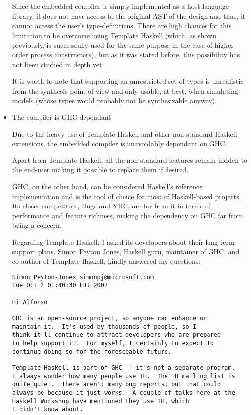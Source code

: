 \documentclass[a4paper,twoside,11pt]{article}
\begin{document}
\begin{itemize}
  Since the embedded compiler is simply implemented as a host language
  library, it does not have access to the original AST of the design and thus,
  it cannot access the user's type-definitions. There are high chances for
  this limitation to be overcome using Template Haskell (which, as shown
  previously, is successfully used for the same purpose in the case of higher
  order process constructors), but as it was stated before, this possibility
  has not been studied in depth yet.

  It is worth to note that supporting an unrestricted set of types is
  unrealistic from the synthesis point of view and only usable, at best, when
  simulating models (whose types would probably not be synthesizable anyway).
  
\item The compiler is GHC-dependant

  Due to the heavy use of Template Haskell and other non-standard Haskell
  extensions, the embedded compiler is unavoidably dependant on GHC.

  Apart from Template Haskell, all the non-standard features remain
  hidden to the end-user making it possible to replace them if desired.
  
  GHC, on the other hand, can be considered Haskell's reference implementation
  and is the tool of choice for most of Haskell-based projects. Its closer
  competitors, Hugs and YHC, are far from it in terms of performance and
  feature richness, making the dependency on GHC far from being a concern.

  Regarding Template Haskell, I asked its developers about their long-term
  support plans. Simon Peyton Jones, Haskell guru, maintainer of GHC, and
  co-author of Template Haskell, kindly answered my questions:

\begin{verbatim}
Simon Peyton-Jones simonpj@microsoft.com
Tue Oct 2 01:40:30 EDT 2007

Hi Alfonso

GHC is an open-source project, so anyone can enhance or 
maintain it.  It's used by thousands of people, so I 
think it'll continue to attract developers who are prepared 
to help support it.  For myself, I certainly to expect to
continue doing so for the foreseeable future.

Template Haskell is part of GHC -- it's not a separate program.  
I always wonder how many people use TH.  The TH mailing list is 
quite quiet.  There aren't many bug reports, but that could 
always be because it just works.  A couple of talks here at the 
Haskell Workshop have mentioned they use TH, which
I didn't know about.


\end{verbatim}
\end{itemize}
\end{document}
